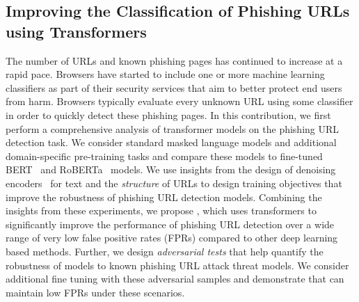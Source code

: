 \subsection{Improving the Classification of Phishing URLs using Transformers}
The number of URLs and known phishing pages has continued to increase at a rapid pace.
Browsers have started to include one or more machine learning classifiers as part of their security services that aim to better protect end users from harm.
Browsers typically evaluate every unknown URL using some classifier in order to quickly detect these phishing pages.
In this contribution, we first perform a comprehensive analysis of transformer models on the phishing URL detection task.
We consider standard masked language models and additional domain-specific pre-training tasks and compare these models to fine-tuned BERT~\citep{devlin2019bert} and RoBERTa~\citep{liu2019roberta} models.
We use insights from the design of denoising encoders~\cite{lewis2020bart,clark2020electra} for text and the \textit{structure} of URLs to design training objectives that improve the robustness of phishing URL detection models.
Combining the insights from these experiments, we propose \URLTranSys, which uses transformers to significantly improve the performance of phishing URL detection over a wide range of very low false positive rates (FPRs) compared to other deep learning based methods.
Further, we design \textit{adversarial tests} that help quantify the robustness of models to known phishing URL attack threat models. 
We consider additional fine tuning with these adversarial samples and demonstrate that \URLTranSys can maintain low FPRs under these scenarios.


